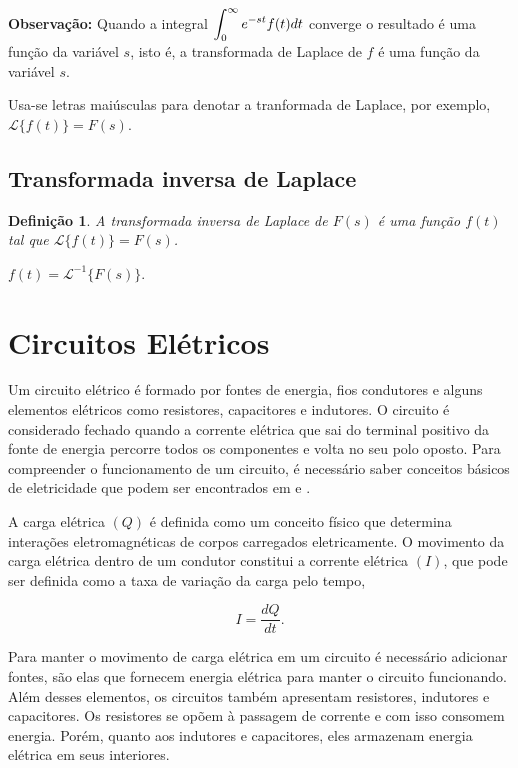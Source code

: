 \documentclass[10pt,twoside,a4paper]{article}
\newtheorem{definition}[theorem]{Definição}
\begin{document}
{\bf Observação:} Quando a integral $\displaystyle \displaystyle \int^{\infty}_{0} e^{-st}f(t)dt$ converge o resultado é uma função da variável $s$, isto é, a transformada de Laplace de $f$ é uma função da variável $s$.

 Usa-se letras maiúsculas para denotar a tranformada de Laplace, por exemplo, $\mathcal{L}\{f(t)\} = F(s)$.

\subsection*{Transformada inversa de Laplace}

\begin{definition} A transformada inversa de Laplace de $F(s)$ é uma função $f(t)$ tal que $\mathcal{L}\{f(t)\} = F(s)$.
\end{definition}

 $f(t) = \mathcal{L}^{-1}\{F(s)\}$.

\section{Circuitos Elétricos} 

Um circuito elétrico é formado por fontes de energia, fios condutores e alguns elementos elétricos como resistores, capacitores e indutores. O circuito é considerado fechado quando a corrente elétrica que sai do terminal positivo da fonte de energia percorre todos os componentes e volta no seu polo oposto. Para compreender o funcionamento de um circuito, é necessário saber conceitos básicos de eletricidade que podem ser encontrados em \cite{CHARLES} e \cite{YOUNG} .

A carga elétrica $(Q)$ é definida como um conceito físico que determina interações eletromagnéticas de corpos carregados eletricamente. O movimento da carga elétrica dentro de um condutor constitui a corrente elétrica $(I)$, que pode ser definida como a taxa de variação da carga pelo tempo, 

\begin{equation}
I = \displaystyle \frac{dQ}{dt}.
\end{equation}

Para manter o movimento de carga elétrica em um circuito é necessário adicionar fontes, são elas que fornecem energia elétrica para manter o circuito funcionando. Além desses elementos, os circuitos também apresentam resistores, indutores e capacitores. Os resistores se opõem à passagem de corrente e com isso consomem energia. Porém, quanto aos indutores e capacitores, eles armazenam energia elétrica em seus interiores. 
\end{document}
